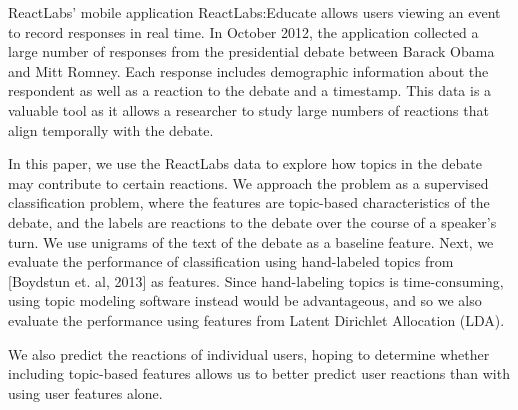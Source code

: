 
ReactLabs' mobile application ReactLabs:Educate allows users viewing an event to record responses in real time. In October 2012, the application collected a large number of responses from the presidential debate between Barack Obama and Mitt Romney. Each response includes demographic information about the respondent as well as a reaction to the debate and a timestamp. This data is a valuable tool as it allows a researcher to study large numbers of reactions that align temporally with the debate.

In this paper, we use the ReactLabs data to explore how topics in the debate may contribute to certain reactions. We approach the problem as a supervised classification problem, where the features are topic-based characteristics of the debate, and the labels are reactions to the debate over the course of a speaker's turn. We use unigrams of the text of the debate as a baseline feature. Next, we evaluate the performance of classification using hand-labeled topics from [Boydstun et. al, 2013] as features. Since hand-labeling topics is time-consuming, using topic modeling software instead would be advantageous, and so we also evaluate the performance using features from Latent Dirichlet Allocation (LDA).

We also predict the reactions of individual users, hoping to determine whether including topic-based features allows us to better predict user reactions than with using user features alone.